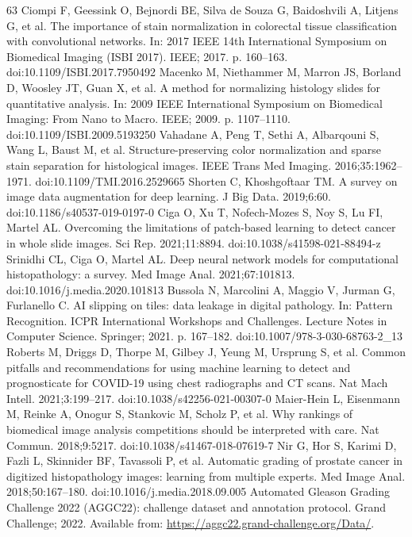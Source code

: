 \documentclass[10pt,letterpaper]{article}
\begin{document}
\begin{thebibliography}{63}
 Ciompi F, Geessink O, Bejnordi BE, Silva de Souza G, Baidoshvili A, Litjens G, et al. The importance of stain normalization in colorectal tissue classification with convolutional networks. In: 2017 IEEE 14th International Symposium on Biomedical Imaging (ISBI 2017). IEEE; 2017. p. 160--163. doi:10.1109/ISBI.2017.7950492
 Macenko M, Niethammer M, Marron JS, Borland D, Woosley JT, Guan X, et al. A method for normalizing histology slides for quantitative analysis. In: 2009 IEEE International Symposium on Biomedical Imaging: From Nano to Macro. IEEE; 2009. p. 1107--1110. doi:10.1109/ISBI.2009.5193250
 Vahadane A, Peng T, Sethi A, Albarqouni S, Wang L, Baust M, et al. Structure-preserving color normalization and sparse stain separation for histological images. IEEE Trans Med Imaging. 2016;35:1962--1971. doi:10.1109/TMI.2016.2529665
 Shorten C, Khoshgoftaar TM. A survey on image data augmentation for deep learning. J Big Data. 2019;6:60. doi:10.1186/s40537-019-0197-0
 Ciga O, Xu T, Nofech-Mozes S, Noy S, Lu FI, Martel AL. Overcoming the limitations of patch-based learning to detect cancer in whole slide images. Sci Rep. 2021;11:8894. doi:10.1038/s41598-021-88494-z
 Srinidhi CL, Ciga O, Martel AL. Deep neural network models for computational histopathology: a survey. Med Image Anal. 2021;67:101813. doi:10.1016/j.media.2020.101813
 Bussola N, Marcolini A, Maggio V, Jurman G, Furlanello C. AI slipping on tiles: data leakage in digital pathology. In: Pattern Recognition. ICPR International Workshops and Challenges. Lecture Notes in Computer Science. Springer; 2021. p. 167--182. doi:10.1007/978-3-030-68763-2\_13
 Roberts M, Driggs D, Thorpe M, Gilbey J, Yeung M, Ursprung S, et al. Common pitfalls and recommendations for using machine learning to detect and prognosticate for COVID-19 using chest radiographs and CT scans. Nat Mach Intell. 2021;3:199--217. doi:10.1038/s42256-021-00307-0
 Maier-Hein L, Eisenmann M, Reinke A, Onogur S, Stankovic M, Scholz P, et al. Why rankings of biomedical image analysis competitions should be interpreted with care. Nat Commun. 2018;9:5217. doi:10.1038/s41467-018-07619-7
 Nir G, Hor S, Karimi D, Fazli L, Skinnider BF, Tavassoli P, et al. Automatic grading of prostate cancer in digitized histopathology images: learning from multiple experts. Med Image Anal. 2018;50:167--180. doi:10.1016/j.media.2018.09.005
 Automated Gleason Grading Challenge 2022 (AGGC22): challenge dataset and annotation protocol. Grand Challenge; 2022. Available from: \url{https://aggc22.grand-challenge.org/Data/}.

\end{thebibliography}
\end{document}
